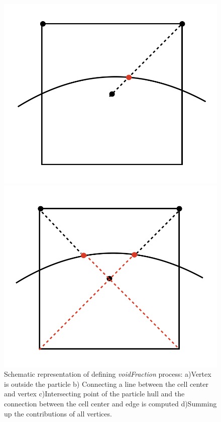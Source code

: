 \begin{figure}[H]
    \begin{minipage}[b]{0.47\textwidth}
        \centering
        \includegraphics[width=\textwidth]{Images/chap3/3.png}
        \subcaption{}
    \end{minipage}
    \hfill
    \begin{minipage}[b]{0.47\textwidth}
        \centering
        \includegraphics[width=\textwidth]{Images/chap3/4.png}
        \subcaption{}
    \end{minipage}

    \caption{Schematic representation of defining \textit{voidFraction} process: a)Vertex is outside the particle b) Connecting a line between the cell center and vertex c)Intersecting point of the particle hull and the connection between the cell center and edge is computed d)Summing up the contributions of all vertices.}
    \label{fig:voidfraction-process}
\end{figure}

